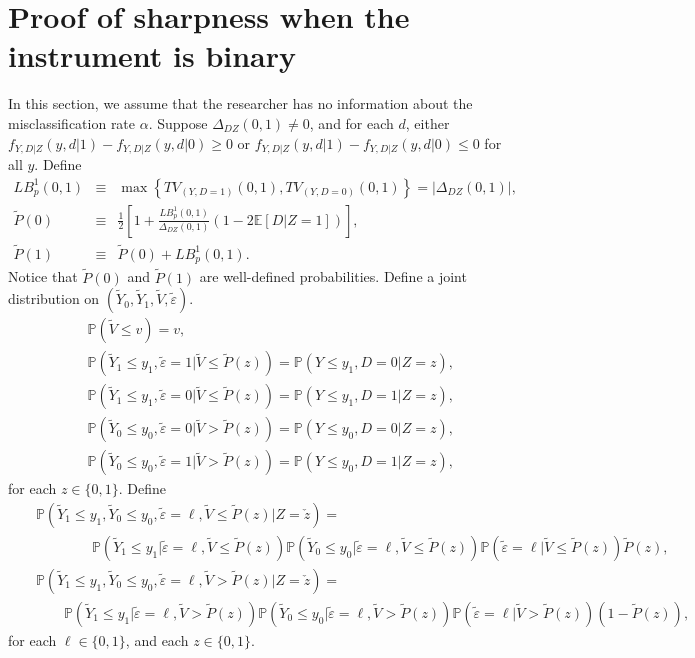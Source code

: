\documentclass[11pt,reqno]{amsart}
\theoremstyle{plain}
\numberwithin{equation}{section}
\begin{document}
\section{Proof of sharpness when the instrument is binary}\label{proofUra}
In this section, we assume that the researcher has no information about the misclassification rate $\alpha$.
Suppose $\Delta_{DZ}(0,1)\neq 0$, and for each $d$, either $f_{Y,D\vert Z}(y,d\vert 1)-f_{Y,D\vert Z}(y,d\vert 0)\geq 0$ or $f_{Y,D\vert Z}(y,d\vert 1)-f_{Y,D\vert Z}(y,d\vert 0)\leq 0$ for all $y$. Define 
\begin{eqnarray*}
LB^1_p(0,1) &\equiv& \max\left\{TV_{(Y,D=1)}(0,1), TV_{(Y,D=0)}(0,1)\right\}=\lvert \Delta_{DZ}(0,1) \rvert,\\
\tilde{P}(0) &\equiv& \frac{1}{2}\left[1+\frac{LB^1_p(0,1)}{\Delta_{DZ}(0,1)}\left(1-2\mathbb E[D\vert Z=1]\right)\right],\\ %
\tilde{P}(1) &\equiv& \tilde{P}(0) +LB^1_p(0,1).
\end{eqnarray*}
Notice that $\tilde{P}(0)$ and $\tilde{P}(1)$ are well-defined probabilities. Define a joint distribution on $(\tilde{Y}_0,\tilde{Y}_1,\tilde{V}, \tilde{\varepsilon})$. 
\begin{eqnarray*}
&& \mathbb P(\tilde{V} \leq v)=v,\\
&& \mathbb P(\tilde{Y}_1\leq y_1,\tilde{\varepsilon}=1\vert \tilde{V} \leq \tilde{P}(z))= \mathbb P(Y\leq y_1,D=0\vert Z=z),\\
&& \mathbb P(\tilde{Y}_1\leq y_1,\tilde{\varepsilon}=0\vert \tilde{V} \leq \tilde{P}(z))= \mathbb P(Y\leq y_1,D=1\vert Z=z),\\
&& \mathbb P(\tilde{Y}_0\leq y_0,\tilde{\varepsilon}=0\vert \tilde{V} > \tilde{P}(z))= \mathbb P(Y\leq y_0,D=0\vert Z=z),\\
&& \mathbb P(\tilde{Y}_0\leq y_0,\tilde{\varepsilon}=1\vert \tilde{V} > \tilde{P}(z))= \mathbb P(Y\leq y_0,D=1\vert Z=z),
\end{eqnarray*}
for each $z \in\{0,1\}$. Define 
\begin{eqnarray*}
&&\mathbb P(\tilde{Y}_1\leq y_1, \tilde{Y}_0 \leq y_0, \tilde{\varepsilon}=\ell, \tilde{V} \leq \tilde{P}(z)\vert Z=\check{z}) =\\
 && \qquad \qquad  \mathbb P(\tilde{Y}_1\leq y_1\vert \tilde{\varepsilon}=\ell, \tilde{V} \leq \tilde{P}(z)) \mathbb P(\tilde{Y}_0 \leq y_0\vert \tilde{\varepsilon}=\ell, \tilde{V} \leq \tilde{P}(z)) \mathbb P( \tilde{\varepsilon}=\ell\vert \tilde{V} \leq \tilde{P}(z)) \tilde{P}(z),\\
&&\mathbb P(\tilde{Y}_1\leq y_1, \tilde{Y}_0 \leq y_0, \tilde{\varepsilon}=\ell, \tilde{V} > \tilde{P}(z)\vert Z=\check{z}) =\\
&& \qquad \mathbb P(\tilde{Y}_1\leq y_1\vert \tilde{\varepsilon}=\ell, \tilde{V} > \tilde{P}(z)) \mathbb P(\tilde{Y}_0 \leq y_0\vert \tilde{\varepsilon}=\ell, \tilde{V} > \tilde{P}(z)) \mathbb P( \tilde{\varepsilon}=\ell\vert \tilde{V} > \tilde{P}(z)) (1-\tilde{P}(z)),
\end{eqnarray*}
for each $\ell \in\{0,1\}$, and each $z \in\{0,1\}$.
\end{document}
